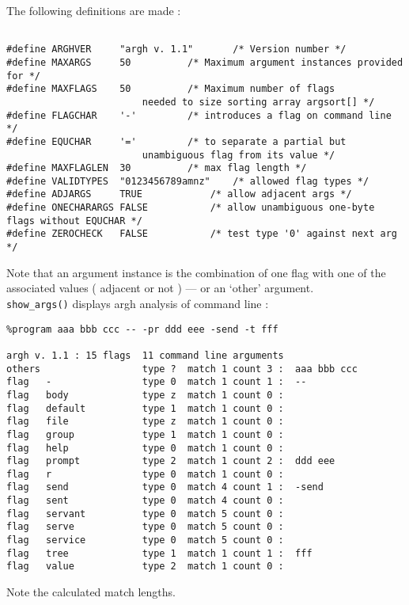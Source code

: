 The following definitions are made :

\footnotesize
\begin{verbatim}

#define ARGHVER		"argh v. 1.1"		/* Version number */
#define MAXARGS		50			/* Maximum argument instances provided for */
#define MAXFLAGS	50			/* Maximum number of flags
						needed to size sorting array argsort[] */
#define	FLAGCHAR	'-'			/* introduces a flag on command line */
#define	EQUCHAR		'='			/* to separate a partial but
						unambiguous flag from its value */
#define	MAXFLAGLEN	30			/* max flag length */
#define VALIDTYPES	"0123456789amnz"	/* allowed flag types */
#define	ADJARGS		TRUE			/* allow adjacent args */
#define	ONECHARARGS	FALSE			/* allow unambiguous one-byte flags without EQUCHAR */
#define	ZEROCHECK	FALSE			/* test type '0' against next arg */

\end{verbatim}
\normalsize

Note that an argument instance is the combination of one flag with one of the
associated values ( adjacent or not ) --- or an `other' argument.\\[2ex]

\verb+show_args()+ displays argh analysis of command line :

\begin{verbatim}
%program aaa bbb ccc -- -pr ddd eee -send -t fff 

argh v. 1.1 : 15 flags  11 command line arguments
others                  type ?  match 1 count 3 :  aaa bbb ccc
flag   -                type 0  match 1 count 1 :  --
flag   body             type z  match 1 count 0 : 
flag   default          type 1  match 1 count 0 : 
flag   file             type z  match 1 count 0 : 
flag   group            type 1  match 1 count 0 : 
flag   help             type 0  match 1 count 0 : 
flag   prompt           type 2  match 1 count 2 :  ddd eee
flag   r                type 0  match 1 count 0 : 
flag   send             type 0  match 4 count 1 :  -send
flag   sent             type 0  match 4 count 0 : 
flag   servant          type 0  match 5 count 0 : 
flag   serve            type 0  match 5 count 0 : 
flag   service          type 0  match 5 count 0 : 
flag   tree             type 1  match 1 count 1 :  fff
flag   value            type 2  match 1 count 0 : 
\end{verbatim}

Note the calculated match lengths.\\[2ex]

